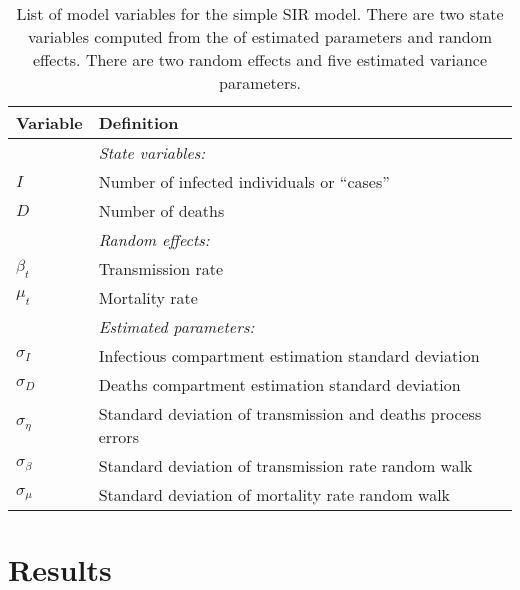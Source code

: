 \documentclass[12pt,letterpaper]{article}
\begin{document}
\begin{table}
\caption{List of model variables for the simple SIR model.
There are two state variables computed from the of estimated
parameters and random effects.
There are two random effects and five estimated variance parameters.
}
\label{tab:allvars1}
\begin{center}
\begin{tabular}{ll}
\hline
Variable & Definition\\
\hline
\hline
       & {\it State variables:}\\
$I$      & Number of infected individuals or ``cases''\\
$D$      & Number of deaths\\
       & {\it Random effects:}\\
$\beta_t$ & Transmission rate\\
$\mu_t$   & Mortality rate\\
       & {\it Estimated parameters:}\\
$\sigma_I$ & Infectious compartment estimation standard deviation\\
$\sigma_D$ & Deaths compartment estimation standard deviation\\
$\sigma_\eta$ & Standard deviation of transmission and deaths process errors\\
$\sigma_\beta$ & Standard deviation of transmission rate random walk\\
$\sigma_\mu$ & Standard deviation of mortality rate random walk\\
\hline
\end{tabular}
\end{center}
\end{table}

\clearpage
\section*{Results}

\end{document}
